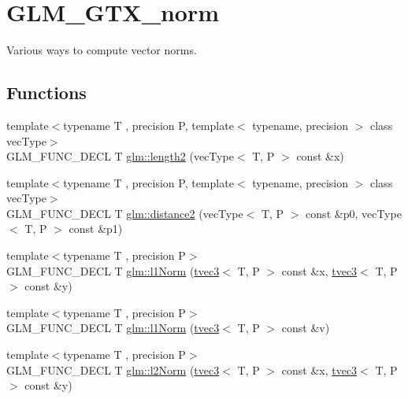 \hypertarget{group__gtx__norm}{}\section{G\+L\+M\+\_\+\+G\+T\+X\+\_\+norm}
\label{group__gtx__norm}


Various ways to compute vector norms.  


\subsection*{Functions}
\begin{DoxyCompactItemize}
\item 
{\footnotesize template$<$typename T , precision P, template$<$ typename, precision $>$ class vec\+Type$>$ }\\G\+L\+M\+\_\+\+F\+U\+N\+C\+\_\+\+D\+E\+CL T \hyperlink{group__gtx__norm_ga6d326d62fd9b7f4f0a1b79e56492a7e4}{glm\+::length2} (vec\+Type$<$ T, P $>$ const \&x)
\item 
{\footnotesize template$<$typename T , precision P, template$<$ typename, precision $>$ class vec\+Type$>$ }\\G\+L\+M\+\_\+\+F\+U\+N\+C\+\_\+\+D\+E\+CL T \hyperlink{group__gtx__norm_ga647d2602008801d6ed78f9708eb439cc}{glm\+::distance2} (vec\+Type$<$ T, P $>$ const \&p0, vec\+Type$<$ T, P $>$ const \&p1)
\item 
{\footnotesize template$<$typename T , precision P$>$ }\\G\+L\+M\+\_\+\+F\+U\+N\+C\+\_\+\+D\+E\+CL T \hyperlink{group__gtx__norm_gaebe5a39b06e262e615622129f37da4f4}{glm\+::l1\+Norm} (\hyperlink{structglm_1_1tvec3}{tvec3}$<$ T, P $>$ const \&x, \hyperlink{structglm_1_1tvec3}{tvec3}$<$ T, P $>$ const \&y)
\item 
{\footnotesize template$<$typename T , precision P$>$ }\\G\+L\+M\+\_\+\+F\+U\+N\+C\+\_\+\+D\+E\+CL T \hyperlink{group__gtx__norm_ga6d5964f09cdb43803496a5ee3ced71cb}{glm\+::l1\+Norm} (\hyperlink{structglm_1_1tvec3}{tvec3}$<$ T, P $>$ const \&v)
\item 
{\footnotesize template$<$typename T , precision P$>$ }\\G\+L\+M\+\_\+\+F\+U\+N\+C\+\_\+\+D\+E\+CL T \hyperlink{group__gtx__norm_gafa6fbbc99cd44d81bf030e74eaf7ad64}{glm\+::l2\+Norm} (\hyperlink{structglm_1_1tvec3}{tvec3}$<$ T, P $>$ const \&x, \hyperlink{structglm_1_1tvec3}{tvec3}$<$ T, P $>$ const \&y)
\item 

\end{DoxyCompactItemize}
